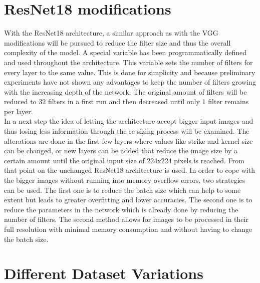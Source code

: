 \section{ResNet18 modifications}

With the ResNet18 architecture, a similar approach as with the VGG modifications will be pursued to reduce the filter size and thus the overall complexity of the model. A special variable has been programmatically defined and used throughout the architecture. This variable sets the number of filters for every layer to the same value. This is done for simplicity and because preliminary  experiments  have not shown any advantages to keep the number of filters growing with the increasing depth of the network. The original amount of filters will be reduced to 32 filters in a first run and then decreased until only 1 filter remains per layer. \\

In a next step the idea of letting the architecture accept bigger input images and thus losing less information through the re-sizing process will be examined. The alterations are done in the first few layers where values like strike and kernel size can be changed, or new layers can be added that reduce the image size by a certain amount until the original input size of 224x224 pixels is reached. From that point on the unchanged ResNet18 architecture is used. In order to cope with the bigger images without running into memory overflow errors, two strategies can be used.  The  first one is  to reduce the batch size which can  help to some extent but leads to greater overfitting and lower accuracies. The second one is to reduce the  parameters in  the network which is already done by reducing the number of filters. The second method allows for images to be processed in their full resolution with minimal memory consumption and without having to change the batch size.\\


\section{Different Dataset Variations}

